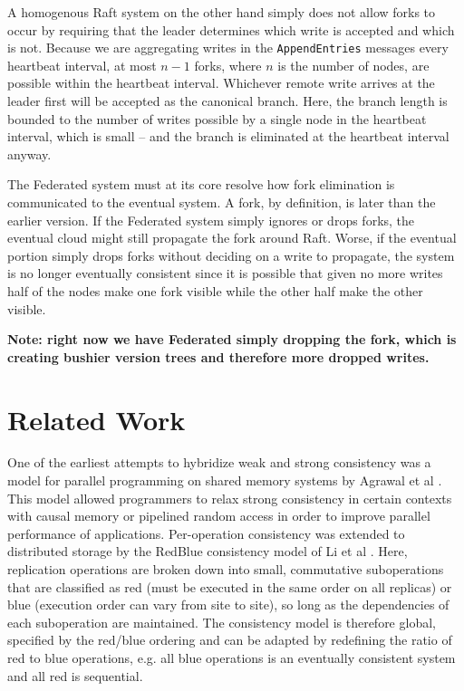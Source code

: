 \documentclass[10pt,conference,letterpaper]{IEEEtran}
\begin{document}
A homogenous Raft system on the other hand simply does not allow forks to occur by requiring that the leader determines which write is accepted and which is not. Because we are aggregating writes in the \texttt{AppendEntries} messages every heartbeat interval, at most $n-1$ forks, where $n$ is the number of nodes, are possible within the heartbeat interval. Whichever remote write arrives at the leader first will be accepted as the canonical branch. Here, the branch length is bounded to the number of writes possible by a single node in the heartbeat interval, which is small -- and the branch is eliminated at the heartbeat interval anyway.

The Federated system must at its core resolve how fork elimination is communicated to the eventual system. A fork, by definition, is later than the earlier version. If the Federated system simply ignores or drops forks, the eventual cloud might still propagate the fork around Raft. Worse, if the eventual portion simply drops forks without deciding on a write to propagate, the system is no longer eventually consistent since it is possible that given no more writes half of the nodes make one fork visible while the other half make the other visible.

\textbf{Note: right now we have Federated simply dropping the fork, which is creating bushier version trees and therefore more dropped writes.}

\section{Related Work}

One of the earliest attempts to hybridize weak and strong consistency was a model for parallel programming on shared memory systems by Agrawal et al \cite{agrawal_mixed_1994}. This model allowed programmers to relax strong consistency in certain contexts with causal memory or pipelined random access in order to improve parallel performance of applications. Per-operation consistency was extended to distributed storage by the RedBlue consistency model of Li et al \cite{li_making_2012}. Here, replication operations are broken down into small, commutative suboperations that are classified as red (must be executed in the same order on all replicas) or blue (execution order can vary from site to site), so long as the dependencies of each suboperation are maintained. The consistency model is therefore global, specified by the red/blue ordering and can be adapted by redefining the ratio of red to blue operations, e.g. all blue operations is an eventually consistent system and all red is sequential.
\end{document}
